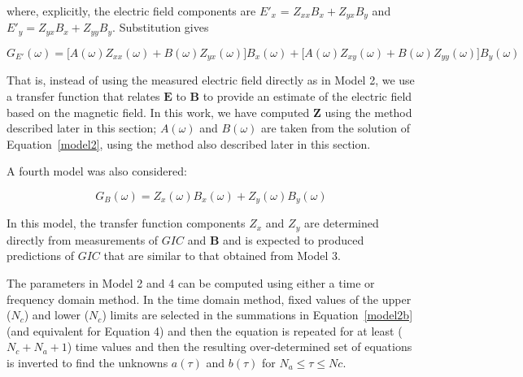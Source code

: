 \documentclass[draft,linenumbers]{agujournal2018}
\begin{document}
\noindent
where, explicitly, the electric field components are $E'_x$ = $Z_{xx}B_x + Z_{yx}B_y$ and $E'_y = Z_{yx}B_x + Z_{yy}B_y$. Substitution gives

\begin{equation*}
G_{E'}(\omega) = \big[A(\omega)Z_{xx}(\omega) + B(\omega)Z_{yx}(\omega) \big] B_x(\omega) + \big[ A(\omega)Z_{xy}(\omega) + B(\omega)Z_{yy}(\omega) \big] B_y(\omega)
\end{equation*}

That is, instead of using the measured electric field directly as in Model 2, we use a transfer function that relates $\mathbf{E}$ to $\mathbf{B}$ to provide an estimate of the electric field based on the magnetic field. In this work, we have computed $\mathbf{Z}$ using the method described later in this section; $A(\omega)$ and $B(\omega)$ are taken from the solution of Equation~\ref{model2}, using the method also described later in this section.

A fourth model was also considered:

\begin{linenomath*}
\begin{equation}
G_B(\omega) = Z_x(\omega)B_x(\omega) + Z_y(\omega)B_y(\omega)
\end{equation}
\end{linenomath*}

\noindent
In this model, the transfer function components $Z_x$ and $Z_y$ are determined directly from measurements of $GIC$ and $\mathbf{B}$ and is expected to produced predictions of $GIC$ that are similar to that obtained from Model 3.

The parameters in Model 2 and 4 can be computed using either a time or frequency domain method. In the time domain method, fixed values of the upper ($N_c$) and lower ($N_c$) limits are selected in the summations in Equation~\ref{model2b} (and equivalent for Equation 4) and then the equation is repeated for at least ($N_c+N_a+1$) time values and then the resulting over-determined set of equations is inverted to find the unknowns $a(\tau)$ and $b(\tau)$ for $N_a \le \tau \le Nc$.
\end{document}
